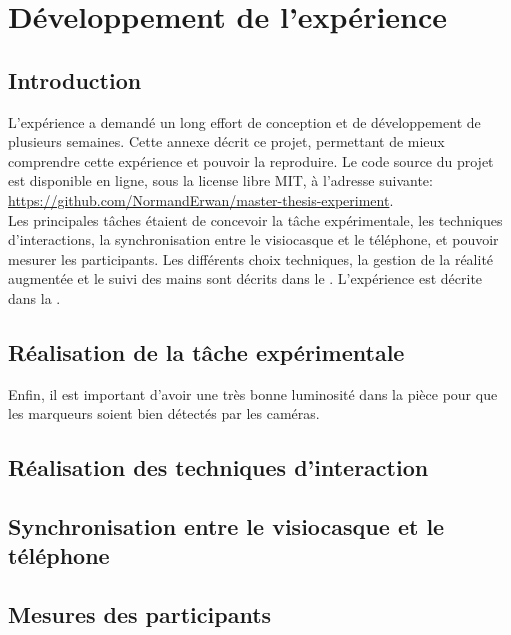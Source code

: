 \chapter{Développement de l'expérience}
\label{annex:experiment}

\section{Introduction}
L'expérience a demandé un long effort de conception et de développement de plusieurs semaines. Cette annexe décrit ce projet, permettant de mieux comprendre cette expérience et pouvoir la reproduire. Le code source du projet est disponible en ligne, sous la license libre MIT, à l'adresse suivante: \url{https://github.com/NormandErwan/master-thesis-experiment}.\\
Les principales tâches étaient de concevoir la tâche expérimentale, les techniques d'interactions, la synchronisation entre le visiocasque et le téléphone, et pouvoir mesurer les participants. Les différents choix techniques, la gestion de la réalité augmentée et le suivi des mains sont décrits dans le . L'expérience est décrite dans la .

\section{Réalisation de la tâche expérimentale}

Enfin, il est important d'avoir une très bonne luminosité dans la pièce pour que les marqueurs soient bien détectés par les caméras.

\section{Réalisation des techniques d'interaction}

\section{Synchronisation entre le visiocasque et le téléphone}

\section{Mesures des participants}